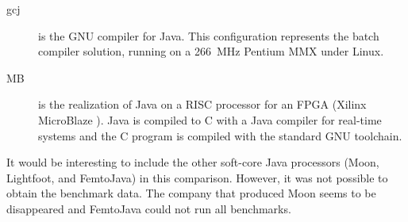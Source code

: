\begin{description}
    \item[gcj]
is the GNU compiler for Java. This configuration represents the
batch compiler solution, running on a 266~MHz Pentium MMX under
Linux.

    \item[MB]
is the realization of Java on a RISC processor for an FPGA (Xilinx
MicroBlaze \cite{microblaze}). Java is compiled to C with a Java
compiler for real-time systems \cite{Java2C} and the C program is
compiled with the standard GNU toolchain.

\end{description}

It would be interesting to include the other soft-core Java
processors (Moon, Lightfoot, and FemtoJava) in this comparison.
However, it was not possible to obtain the benchmark data. The
company that produced Moon seems to be disappeared and FemtoJava
could not run all benchmarks.


